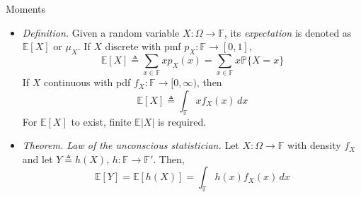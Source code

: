 \documentclass{beamer}
\numberwithin{equation}{section}
\begin{document}
\begin{frame}{Moments}
    \begin{itemize}
        \item
        \textit{Definition.} Given a random variable
        $ X : \Omega \rightarrow \mathbb{F} $, its \textit{expectation} is
        denoted as $ \mathbb{E}[X] $ or $ \mu_X $. If $ X $ discrete with pmf
        $ p_X : \mathbb{F} \rightarrow [0, 1] $,
        \begin{equation*}
            \mathbb{E}[X] \triangleq \sum_{x \in \mathbb{F}}xp_X(x) =
            \sum_{x \in \mathbb{F}}x\mathbb{P}\{X = x\}
        \end{equation*}
        If $ X $ continuous with pdf
        $ f_X : \mathbb{F} \rightarrow [0, \infty) $, then
        \begin{equation*}
            \mathbb{E}[X] \triangleq \int_\mathbb{F}xf_X(x)\,dx
        \end{equation*}
        For $ \mathbb{E}[X] $ to exist, finite $ \mathbb{E}|X| $ is required.

        \item
        \textit{Theorem. Law of the unconscious statistician.} Let
        $ X : \Omega \rightarrow \mathbb{F} $ with
        density\footnotemark{} $ f_X $ and let
        $ Y \triangleq h(X) $, $ h : \mathbb{F} \rightarrow \mathbb{F}' $. Then,
        \begin{equation*}
            \mathbb{E}[Y] = \mathbb{E}[h(X)] = \int_\mathbb{F}h(x)f_X(x)\,dx
        \end{equation*}
    \end{itemize}

    \medskip

\end{frame}
\end{document}
